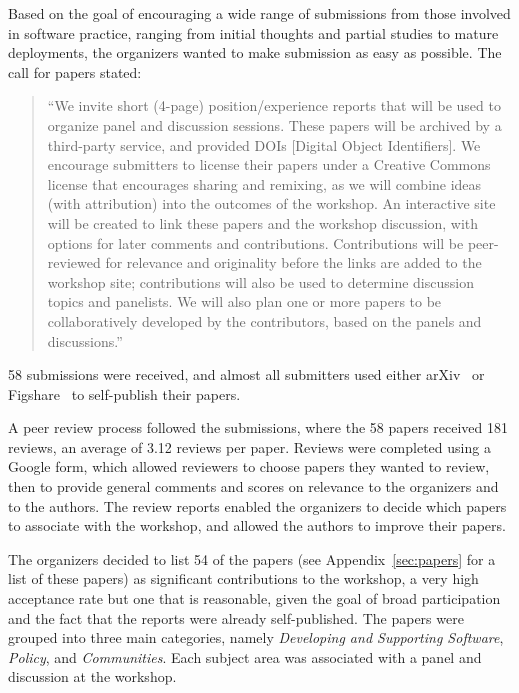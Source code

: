 \documentclass[11pt, oneside]{amsart}
\begin{document}
Based on the goal of encouraging a wide range of submissions from
those involved in software practice, ranging from initial thoughts and
partial studies to mature deployments, the organizers wanted to make
submission as easy as possible. The call for papers stated:

\begin{quote}
``We invite short (4-page) position/experience reports that will be used
to organize panel and discussion sessions. These papers will be
archived by a third-party service, and provided DOIs [Digital Object Identifiers].
We encourage
submitters to license their papers under a Creative Commons license
that encourages sharing and remixing, as we will combine ideas (with
attribution) into the outcomes of the workshop.  An interactive site
will be created to link these papers and the workshop discussion, with
options for later comments and contributions. Contributions will be
peer-reviewed for relevance and originality before the links are added
to the workshop site; contributions will also be used to determine
discussion topics and panelists. We will also plan one or more papers
to be collaboratively developed by the contributors, based on the
panels and discussions.''
\end{quote}

58 submissions were received, and almost all submitters used either
arXiv~\cite{arXiv-web} or Figshare~\cite{figshare-web} to self-publish
their papers.

A peer review process followed the submissions, where
the 58 papers received 181 reviews, an average of 3.12 reviews per
paper. Reviews were completed using a Google form, which allowed
reviewers to choose papers they wanted to review, then to provide
general comments and scores on relevance to the organizers and
to the authors. The review reports enabled the organizers to decide
which papers to associate with the workshop, and allowed the authors
to improve their papers.

The organizers decided to list 54 of the papers (see Appendix~\ref{sec:papers} for a list of these papers) as significant
contributions to the workshop, a very high acceptance rate but one
that is reasonable, given the goal of broad participation and the fact
that the reports were already self-published. The papers were
grouped into three main categories, namely \emph{Developing and
Supporting Software}, \emph{Policy}, and \emph{Communities}. Each
subject area was associated with a panel and discussion at the
workshop.
\end{document}
